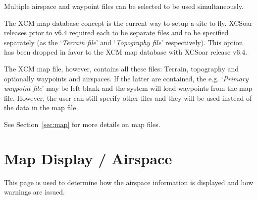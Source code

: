 Multiple airspace and waypoint files can be selected to be used simultaneously.

The XCM map database concept is the current way to setup a site to fly.
XCSoar releases prior to v6.4 required each to be separate files and to be
specified separately (as the `{\it Terrain file}' and `{\it Topography file}' respectively). This 
option has been dropped in favor to the XCM map database with XCSoar release v6.4.  

The XCM map file, however, contains all these files: Terrain, topography
and optionally waypoints and airspaces.  If the latter are contained, the e.g. `{\it Primary waypoint file}' 
may be left blank and the system will load waypoints from the map file. 
However, the user can still specify other files and they will be used instead of 
the data in the map file.

See Section~\ref{sec:map} for more details on map files.


\section{Map Display / Airspace}\label{sec:map-airspace}

This page is used to determine how the airspace information is
displayed and how warnings are issued.

